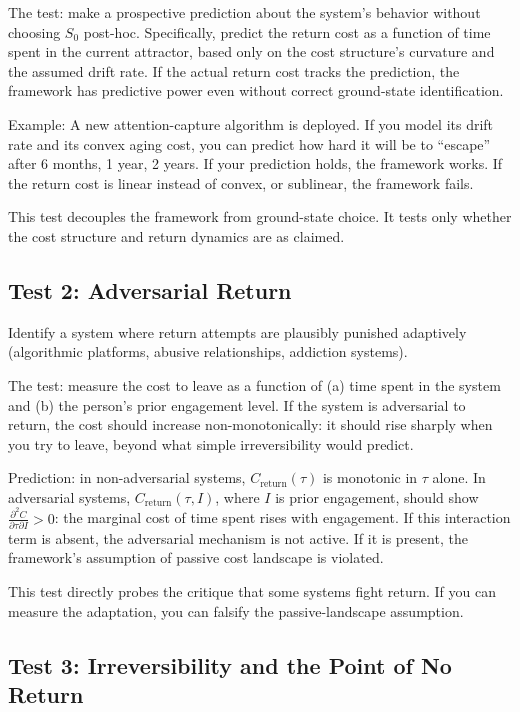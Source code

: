 \documentclass[12pt]{article}
\begin{document}
The test: make a prospective prediction about the system's behavior without choosing $S_0$ post-hoc. Specifically, predict the return cost as a function of time spent in the current attractor, based only on the cost structure's curvature and the assumed drift rate. If the actual return cost tracks the prediction, the framework has predictive power even without correct ground-state identification.

Example: A new attention-capture algorithm is deployed. If you model its drift rate and its convex aging cost, you can predict how hard it will be to ``escape'' after 6 months, 1 year, 2 years. If your prediction holds, the framework works. If the return cost is linear instead of convex, or sublinear, the framework fails.

This test decouples the framework from ground-state choice. It tests only whether the cost structure and return dynamics are as claimed.

\subsection{Test 2: Adversarial Return}

Identify a system where return attempts are plausibly punished adaptively (algorithmic platforms, abusive relationships, addiction systems).

The test: measure the cost to leave as a function of (a) time spent in the system and (b) the person's prior engagement level. If the system is adversarial to return, the cost should increase non-monotonically: it should rise sharply when you try to leave, beyond what simple irreversibility would predict.

Prediction: in non-adversarial systems, $C_{\text{return}}(\tau)$ is monotonic in $\tau$ alone. In adversarial systems, $C_{\text{return}}(\tau, I)$, where $I$ is prior engagement, should show $\frac{\partial^2 C}{\partial \tau \partial I} > 0$: the marginal cost of time spent rises with engagement. If this interaction term is absent, the adversarial mechanism is not active. If it is present, the framework's assumption of passive cost landscape is violated.

This test directly probes the critique that some systems fight return. If you can measure the adaptation, you can falsify the passive-landscape assumption.

\subsection{Test 3: Irreversibility and the Point of No Return}
\end{document}
